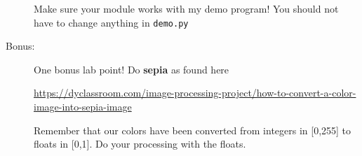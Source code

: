 \documentclass[12pt]{article}
\begin{document}
\begin{description}
Make sure your module works with my demo program!  You should
not have to change anything in \lstinline{demo.py}

\item[Bonus:]  One bonus lab point!  Do {\bf sepia}
as found here 

\url{https://dyclassroom.com/image-processing-project/how-to-convert-a-color-image-into-sepia-image}

Remember that our colors have been converted from 
integers in [0,255] to floats in [0,1].  Do your 
processing with the floats.


\end{description}
\end{document}
